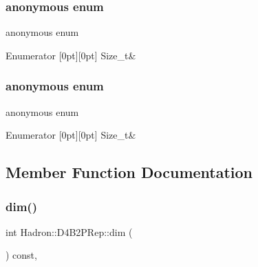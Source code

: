 \subsubsection{\texorpdfstring{anonymous enum}{anonymous enum}}
{\footnotesize\ttfamily anonymous enum}

\begin{DoxyEnumFields}{Enumerator}
[0pt][0pt]{}\mbox{\label{structHadron_1_1D4B2PRep_a48a800d581f5c61a505898fa5eb8603caeb48c5ef339d21027988633769435355}} 
Size\+\_\+t&\\
\hline

\end{DoxyEnumFields}
\mbox{\label{structHadron_1_1D4B2PRep_a48a800d581f5c61a505898fa5eb8603c}} 
\subsubsection{\texorpdfstring{anonymous enum}{anonymous enum}}
{\footnotesize\ttfamily anonymous enum}

\begin{DoxyEnumFields}{Enumerator}
[0pt][0pt]{}\mbox{\label{structHadron_1_1D4B2PRep_a48a800d581f5c61a505898fa5eb8603caeb48c5ef339d21027988633769435355}} 
Size\+\_\+t&\\
\hline

\end{DoxyEnumFields}


\subsection{Member Function Documentation}
\mbox{\label{structHadron_1_1D4B2PRep_a7618d0e6ba704200dac6e55ca799a815}} 
\subsubsection{\texorpdfstring{dim()}{dim()}\hspace{0.1cm}{\footnotesize\ttfamily [1/2]}}
{\footnotesize\ttfamily int Hadron\+::\+D4\+B2\+P\+Rep\+::dim (\begin{DoxyParamCaption}{ }\end{DoxyParamCaption}) const\hspace{0.3cm}{\ttfamily [inline]}, {\ttfamily [virtual]}}

